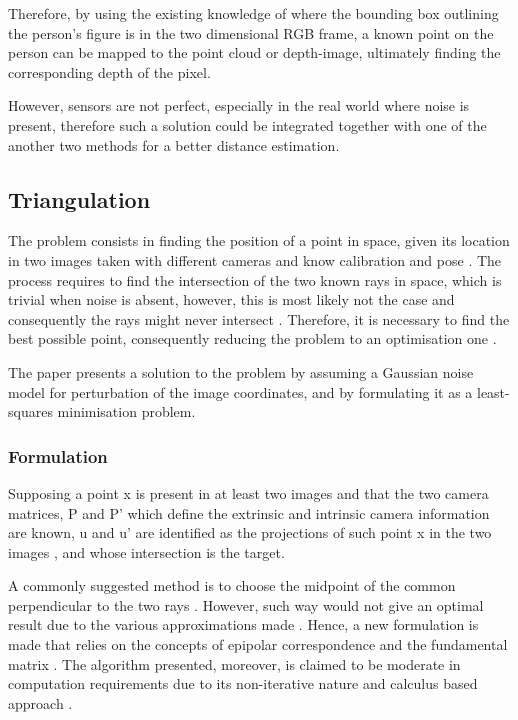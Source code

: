 Therefore, by using the existing knowledge of where the bounding box outlining the person's figure is in the two dimensional RGB frame, a known point on the person  can be mapped to the point cloud or depth-image, ultimately finding the corresponding depth of the pixel.

However, sensors are not perfect, especially in the real world where noise is present, therefore such a solution could be integrated together with one of the another two methods for a better distance estimation.

\subsection{Triangulation}

The problem consists in finding the position of a point in space, given its location in two images taken with different cameras and know calibration and pose \cite{hartley1997triangulation}. The process requires to find the intersection of the two known rays in space, which is trivial when noise is absent, however, this is most likely not the case and consequently the rays might never intersect \cite{hartley1997triangulation}. Therefore, it is necessary to find the best possible point, consequently reducing the problem to an optimisation one \cite{hartley1997triangulation}.

The paper presents a solution to the problem by assuming a Gaussian noise model for perturbation of the image coordinates, and by formulating it as a least-squares minimisation problem.

\subsubsection{Formulation}

Supposing a point x is present in at least two images and that the two camera matrices, P and P' which define the extrinsic and intrinsic camera information are known, u and u' are identified as the projections of such point x in the two images \cite{hartley1997triangulation}, and whose intersection is the target.

A commonly suggested method is to choose the midpoint of the common perpendicular to the two rays \cite{hartley1997triangulation}. However, such way would not give an optimal result due to the various approximations made \cite{hartley1997triangulation}. Hence, a new formulation is made that relies on the concepts of epipolar correspondence and the fundamental matrix \cite{hartley1997triangulation}. The algorithm presented, moreover, is claimed to be moderate in computation requirements due to its non-iterative nature and calculus based approach \cite{hartley1997triangulation}.

